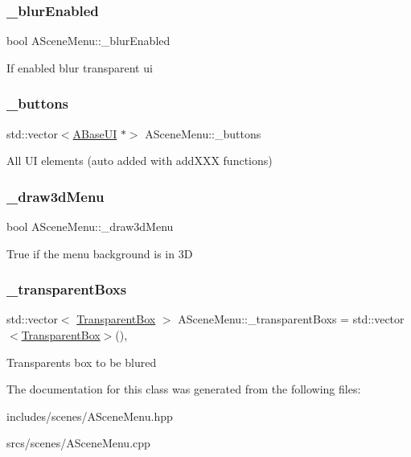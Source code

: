 \subsubsection{\texorpdfstring{\+\_\+blur\+Enabled}{\_blurEnabled}}
{\footnotesize\ttfamily bool A\+Scene\+Menu\+::\+\_\+blur\+Enabled\hspace{0.3cm}{\ttfamily [protected]}}

If enabled blur transparent ui \mbox{\label{class_a_scene_menu_ae18fa3a41aef71fd11a3166221b69024}} 
\subsubsection{\texorpdfstring{\+\_\+buttons}{\_buttons}}
{\footnotesize\ttfamily std\+::vector$<$\hyperlink{class_a_base_u_i}{A\+Base\+UI} $\ast$$>$ A\+Scene\+Menu\+::\+\_\+buttons\hspace{0.3cm}{\ttfamily [protected]}}

All UI elements (auto added with add\+X\+XX functions) \mbox{\label{class_a_scene_menu_a10b81e94fdaeb7d466279db7c184d8f9}} 
\subsubsection{\texorpdfstring{\+\_\+draw3d\+Menu}{\_draw3dMenu}}
{\footnotesize\ttfamily bool A\+Scene\+Menu\+::\+\_\+draw3d\+Menu\hspace{0.3cm}{\ttfamily [protected]}}

True if the menu background is in 3D \mbox{\label{class_a_scene_menu_a1ffe04b2d54c01c3bbcc7a15ea14d901}} 
\subsubsection{\texorpdfstring{\+\_\+transparent\+Boxs}{\_transparentBoxs}}
{\footnotesize\ttfamily std\+::vector$<$ \hyperlink{struct_transparent_box}{Transparent\+Box} $>$ A\+Scene\+Menu\+::\+\_\+transparent\+Boxs = std\+::vector$<$\hyperlink{struct_transparent_box}{Transparent\+Box}$>$()\hspace{0.3cm}{\ttfamily [static]}, {\ttfamily [protected]}}

Transparents box to be blured 

The documentation for this class was generated from the following files\+:\begin{DoxyCompactItemize}
\item 
includes/scenes/A\+Scene\+Menu.\+hpp\item 
srcs/scenes/A\+Scene\+Menu.\+cpp\end{DoxyCompactItemize}
